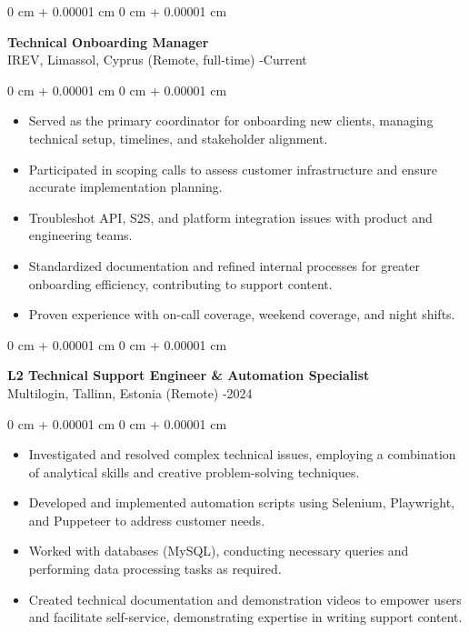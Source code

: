 \documentclass[10pt, letterpaper]{article}
\newenvironment{highlights}{
    \begin{itemize}[
        topsep=0.10 cm,
        parsep=0.10 cm,
        partopsep=0pt,
        itemsep=0pt,
        leftmargin=0 cm + 10pt
    ]
}{
    \end{itemize}
}
\newenvironment{onecolentry}{
    \begin{adjustwidth}{
        0 cm + 0.00001 cm
    }{
        0 cm + 0.00001 cm
    }
}{
    \end{adjustwidth}
}
\begin{document}
\begin{onecolentry}
    \setcolumnwidth{\fill, 4.5cm}
    \begin{paracol}{2}
        \textbf{Technical Onboarding Manager} \\ IREV, Limassol, Cyprus (Remote, full-time)
        \switchcolumn
        -Current
    \end{paracol}
\end{onecolentry}
\vspace{0.10cm}
\begin{onecolentry}
    \begin{highlights}
                \item Served as the primary coordinator for onboarding new clients, managing technical setup, timelines, and stakeholder alignment.
                \item Participated in scoping calls to assess customer infrastructure and ensure accurate implementation planning.
                \item Troubleshot API, S2S, and platform integration issues with product and engineering teams.
                \item Standardized documentation and refined internal processes for greater onboarding efficiency, contributing to support content.
                \item Proven experience with on-call coverage, weekend coverage, and night shifts.
    \end{highlights}
\end{onecolentry}

\vspace{0.2cm}

\begin{onecolentry}
    \setcolumnwidth{\fill, 4.5cm}
    \begin{paracol}{2}
        \textbf{L2 Technical Support Engineer \& Automation Specialist} \\ Multilogin, Tallinn, Estonia (Remote)
        \switchcolumn
        -2024
    \end{paracol}
\end{onecolentry}
\vspace{0.10cm}
\begin{onecolentry}
    \begin{highlights}
                \item Investigated and resolved complex technical issues, employing a combination of analytical skills and creative problem-solving techniques.
                \item Developed and implemented automation scripts using Selenium, Playwright, and Puppeteer to address customer needs.
                \item Worked with databases (MySQL), conducting necessary queries and performing data processing tasks as required.
                \item Created technical documentation and demonstration videos to empower users and facilitate self-service, demonstrating expertise in writing support content.
    \end{highlights}
\end{onecolentry}
\end{document}
